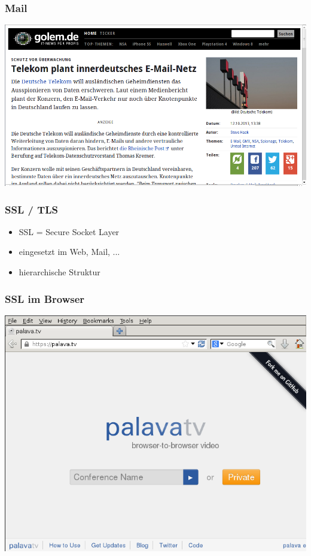 \documentclass[12pt]{beamer}
\newcommand{\cc}[1]{\texttt{[image: img/\#1.png]}}
\begin{document}
\begin{frame}
    \frametitle{Mail}
    \includegraphics[height=0.7\textheight]{img/telekom_mail.png}
\end{frame}



\begin{frame}
    \frametitle{SSL / TLS}
    \begin{itemize}
      \item<2-> SSL = Secure Socket Layer
      \item<3-> eingesetzt im Web, Mail, ...
      \item<4-> hierarchische Struktur
    \end{itemize}
\end{frame}

\begin{frame}
    \frametitle{SSL im Browser}
    \includegraphics[height=0.7\textheight]{img/ssl_verified.png}
\end{frame}
\end{document}
